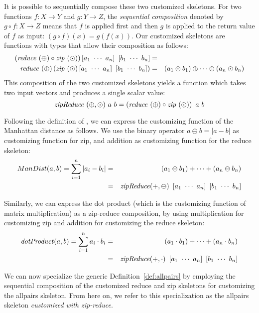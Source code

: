 It is possible to sequentially compose these two customized skeletons.
For two functions $f: X \to Y$ and $g: Y\to Z$, the \emph{sequential composition} denoted by $g \circ f: X \to Z$ means that $f$ is applied first and then $g$ is applied to the return value of $f$ as input: $(g\circ f)(x) = g(f(x))$.
Our customized skeletons are functions with types that allow their composition as follows:
\begin{eqnarray*}
  (\reduce\ (\oplus) \circ \zip\ (\odot) ) \DottedVector{a_1}{a_n}\ \DottedVector{b_1}{b_n} &=& \\
  \reduce\ (\oplus) \left( \zip\ (\odot) \DottedVector{a_1}{a_n}\ \DottedVector{b_1}{b_n} \right) &=& (a_1 \odot b_1) \oplus \cdots \oplus (a_n \odot b_n)
\end{eqnarray*}
This composition of the two customized skeletons yields a function which takes two input vectors and produces a single scalar value:
\begin{equation}
  \zipReduce\ (\oplus, \odot)\ a\ b = 
  \left( \reduce\ (\oplus) \circ \zip\ (\odot) \right)\ a\ b
\end{equation}

Following the definition of {\zipReduce}, we can express the customizing function of the Manhattan distance as follows.
We use the binary operator $a \ominus b = |a - b|$ as customizing function for zip, and addition as customizing function for the reduce skeleton:
\begin{eqnarray*}
    ManDist(a, b) = \sum_{i=1}^{n} | a_i - b_i | &=&
    (a_1 \ominus b_1) + \cdots + (a_n \ominus b_n) \\
    &=& \zipReduce(+, \ominus)\ \DottedVector{a_1}{a_n}\ \DottedVector{b_1}{b_n}
\end{eqnarray*}

Similarly, we can express the dot product (which is the customizing function of matrix multiplication) as a zip-reduce composition, by using multiplication for customizing zip and addition for customizing the reduce skeleton:
\begin{eqnarray*}
  \dotProduct(a, b) = \sum_{i = 1}^{n} a_i \cdot b_i &=& (a_1 \cdot b_1) + \cdots + (a_n \cdot b_n) \\
  &=& \zipReduce(+, \cdot)\ \DottedVector{a_1}{a_n}\ \DottedVector{b_1}{b_n}
\end{eqnarray*}

We can now specialize the generic Definition~\ref{def:allpairs} by employing the sequential composition of the customized reduce and zip skeletons for customizing the allpairs skeleton.
From here on, we refer to this specialization as the allpairs skeleton \emph{customized with zip-reduce}.

